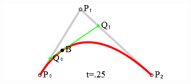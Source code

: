 \begin{note}
\begin{itemize}
\begin{center}
\includegraphics[scale=0.8]{Images/etc/bei}
\end{center}


\end{itemize}


\end{note}